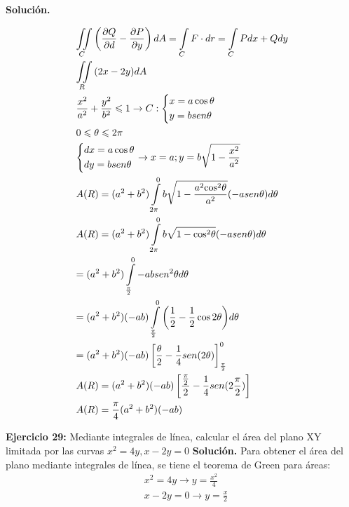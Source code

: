 \documentclass[12pt]{article}
\begin{document}
\noindent \textbf{Solución.}

\vspace{3mm}
\[\begin{gathered}
  \iint\limits_C {\left( {\frac{{\partial Q}}{{\partial d}} - \frac{{\partial P}}{{\partial y}}} \right)dA = \int\limits_C {F \cdot dr = \int\limits_C {Pdx + Qdy} } } \hfill \\
  \iint\limits_R {(2x - 2y)dA} \hfill \\
  \frac{{{x^2}}}{{{a^2}}} + \frac{{{y^2}}}{{{b^2}}} \leqslant 1 \to C:\left\{ \begin{gathered}
  x = a\cos \theta  \hfill \\
  y = bsen\theta  \hfill \\ 
\end{gathered}  \right. \hfill \\
  0 \leqslant \theta  \leqslant 2\pi  \hfill \\
  \left\{ \begin{gathered}
  dx = a\cos \theta  \hfill \\
  dy = bsen\theta  \hfill \\ 
\end{gathered}  \right. \to x = a;y = b\sqrt {1 - \frac{{{x^2}}}{{{a^2}}}}  \hfill \\
  A(R) = ({a^2} + {b^2})\int\limits_{2\pi }^0 {b\sqrt {1 - \frac{{{a^2}{{\cos }^2}\theta }}{{{a^2}}}} ( - asen\theta )d\theta }  \hfill \\
  A(R) = ({a^2} + {b^2})\int\limits_{2\pi }^0 {b\sqrt {1 - {{\cos }^2}\theta } } ( - asen\theta )d\theta  \hfill \\
   = ({a^2} + {b^2})\int\limits_{\frac{\pi }{2}}^0 { - abse{n^2}\theta d\theta }  \hfill \\
   = ({a^2} + {b^2})( - ab)\int\limits_{\frac{\pi }{2}}^0 {\left( {\frac{1}{2} - \frac{1}{2}\cos 2\theta } \right)} d\theta  \hfill \\
   = ({a^2} + {b^2})( - ab)\left[ {\frac{\theta }{2} - \frac{1}{4}sen(2\theta )} \right]_{\frac{\pi }{2}}^0 \hfill \\
  A(R) = ({a^2} + {b^2})( - ab)\left[ {\frac{{\frac{\pi }{2}}}{2} - \frac{1}{4}sen(2\frac{\pi }{2})} \right] \hfill \\
  A(R) = \frac{\pi }{4}({a^2} + {b^2})( - ab) \hfill \\ 
\end{gathered} \]

\noindent \textbf{Ejercicio 29:} Mediante integrales de línea, calcular el área del plano XY limitada por las curvas 
${{x}^{2}}=4y,x-2y=0$
\vspace{5mm}
\noindent \textbf{Solución.}
\vspace{3mm}
Para obtener el área del plano mediante integrales de línea, se tiene el teorema de Green para áreas:\\
\begin{align}
  & {{x}^{2}}=4y\to y=\frac{{{x}^{2}}}{4} \\ 
 & x-2y=0\to y=\frac{x}{2} \\ 
\end{align}
\end{document}

